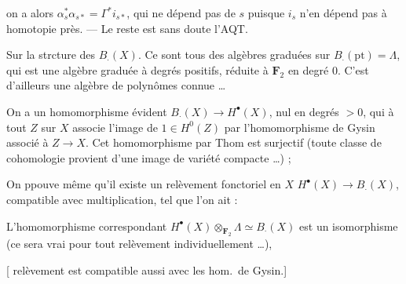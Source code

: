 \documentclass[11pt,a4paper]{article}
\begin{document}

on a alors $\alpha_{s}^{*} \alpha_{s*} = \Gamma^{*} i_{s*}$, qui ne dépend pas
de $s$ puisque $i_{s}$ n'en dépend pas à homotopie près. --- Le reste est sans
doute l'AQT.

Sur la strcture des $B_{\cdot}(X)$. Ce sont tous des algèbres graduées sur
$B_{\cdot}(\mathrm{pt}) = \Lambda$, qui est une algèbre graduée à degrés
positifs, réduite à $\mathbf{F}_{2}$ en degré 0. C'est d'ailleurs une algèbre
de polynômes  connue
…

On a un homomorphisme évident $B_{\cdot}(X) \to H^{\bullet}(X)$, nul en degrés
$> 0$, qui à tout $Z$ sur $X$ associe l'image de $1 \in H^{0}(Z)$ par
l'homomorphisme de Gysin associé à $Z \to X$. Cet homomorphisme par Thom est
surjectif (toute classe de cohomologie provient d'une image de variété compacte
…) ;


On ppouve même qu'il existe un relèvement fonctoriel en $X$ $H^{\bullet}(X)
\to B_{\cdot}(X)$,  compatible avec
multiplication, tel que l'on ait :

 L'homomorphisme correspondant $H^{\bullet}(X)
\otimes_{\mathbf{F}_{2}} \Lambda \simeq B_{\cdot}(X)$ est un isomorphisme (ce
sera vrai pour tout relèvement individuellement …), 

 [  relèvement est compatible
aussi avec les hom.\ de Gysin.]
\end{document}
